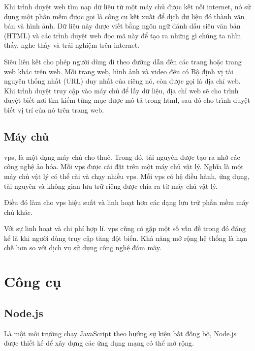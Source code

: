 \documentclass[11pt]{report}
\begin{document}
	Khi trình duyệt web tìm nạp dữ liệu từ một máy chủ được kết nối internet, nó sử dụng một phần mềm được gọi là công cụ kết xuất để dịch dữ liệu đó thành văn bản và hình ảnh. Dữ liệu này được viết bằng ngôn ngữ đánh dấu siêu văn bản (HTML) và các trình duyệt web đọc mã này để tạo ra những gì chúng ta nhìn thấy, nghe thấy và trải nghiệm trên internet.
	
	Siêu liên kết cho phép người dùng đi theo đường dẫn đến các trang hoặc trang web khác trên web. Mỗi trang web, hình ảnh và video đều có Bộ định vị tài nguyên thống nhất (URL) duy nhất của riêng nó, còn được gọi là địa chỉ web. Khi trình duyệt truy cập vào máy chủ để lấy dữ liệu, địa chỉ web sẽ cho trình duyệt biết nơi tìm kiếm từng mục được mô tả trong html, sau đó cho trình duyệt biết vị trí của nó trên trang web.
	
	\subsection{Máy chủ} \label{subsection:webserver}
	
	\acrshort{vps}, là một dạng máy chủ cho thuê. Trong đó, tài nguyên được tạo ra nhờ các công nghệ ảo hóa. Mỗi \acrshort{vps} được cài đặt trên một máy chủ vật lý. Nghĩa là một máy chủ vật lý có thể cài và chạy nhiều \acrshort{vps}. Mỗi \acrshort{vps} có hệ điều hành, ứng dụng, tài nguyên và không gian lưu trữ riêng được chia ra từ máy chủ vật lý.
	
	Điều đó làm cho \acrshort{vps} hiệu suất và linh hoạt hơn các dạng lưu trữ phần mềm máy chủ khác.
	
	Với sự linh hoạt và chi phí hợp lí. \acrshort{vps} cũng có gặp một số vấn đề trong đó đáng kể là khi người dùng truy cập tăng đột biến. Khả năng mở rộng hệ thống là hạn chế hơn so với dịch vụ sử dụng công nghệ đám mây. 
	
	\section{Công cụ}
	
	\subsection{Node.js}
	Là một môi trường chạy JavaScript theo hướng sự kiện bất đồng bộ, Node.js được thiết kế để xây dựng các ứng dụng mạng có thể mở rộng.
	
\end{document}
